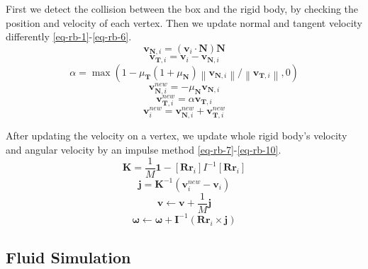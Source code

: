 First we detect the collision between the box and the rigid body, by checking the position and velocity of each vertex. Then we update normal and tangent velocity differently \eqref{eq-rb-1}-\eqref{eq-rb-6}.
\begin{equation}
  \label{eq-rb-1}
\mathbf{v}_{\mathbf{N},i}=(\mathbf{v}_i\cdot \mathbf{N})\mathbf{N}
\end{equation}
\begin{equation}
  \label{eq-rb-2}
\mathbf{v}_{\mathbf{T},i}=\mathbf{v}_i-\mathbf{v}_{\mathbf{N},i}
\end{equation}
\begin{equation}
  \label{eq-rb-3}
  \alpha=\max\left(1-\mu_{\mathbf{T}}(1+\mu_{\mathbf{N}})\left\lVert \mathbf{v}_{\mathbf{N},i}\right\rVert/\left\lVert \mathbf{v}_{\mathbf{T},i}\right\rVert, 0\right)
\end{equation}
\begin{equation}
  \label{eq-rb-4}
  \mathbf{v}_{\mathbf{N},i}^{new}=-\mu_{\mathbf{N}}\mathbf{v}_{\mathbf{N},i}
\end{equation}
\begin{equation}
  \label{eq-rb-5}
  \mathbf{v}_{\mathbf{T},i}^{new}=\alpha\mathbf{v}_{\mathbf{T},i}
\end{equation}
\begin{equation}
  \label{eq-rb-6}
  \mathbf{v}_i^{new}=\mathbf{v}_{\mathbf{N},i}^{new}+\mathbf{v}_{\mathbf{T},i}^{new}
\end{equation}

After updating the velocity on a vertex, we update whole rigid body's velocity and angular velocity by an impulse method \eqref{eq-rb-7}-\eqref{eq-rb-10}. 
\begin{equation}
  \label{eq-rb-7}
  \mathbf{K}=\frac{1}{M}\mathbf{1}-[\mathbf{R}\mathbf{r}_i]I^{-1}[\mathbf{R}\mathbf{r}_i]
\end{equation}
\begin{equation}
  \label{eq-rb-8}
  \mathbf{j}=\mathbf{K}^{-1}(\mathbf{v}_i^{new}-\mathbf{v}_i)
\end{equation}
\begin{equation}
  \label{eq-rb-9}
  \mathbf{v}\leftarrow \mathbf{v}+\frac{1}{M}\mathbf{j}
\end{equation}
\begin{equation}
  \label{eq-rb-10}
  \mathbf{\omega}\leftarrow \mathbf{\omega}+\mathbf{I}^{-1}(\mathbf{R}\mathbf{r}_i\times \mathbf{j})
\end{equation}

\subsection{Fluid Simulation}

